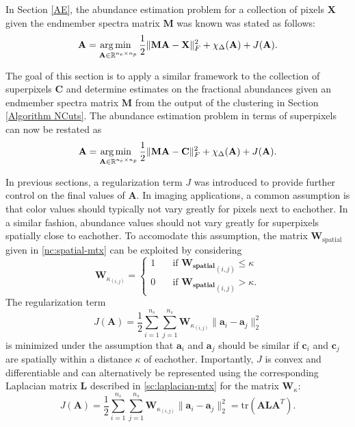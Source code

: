 In Section \ref{AE}, the abundance estimation problem for a collection of pixels $\mathbf{X}$ given the endmember spectra matrix $\mathbf{M}$ was known was stated as follows:
\begin{equation*}
    \mathbf{A} = \operatorname*{arg\,min \;\;}_{\mathbf{A} \in \mathbb{R}^{n_e \times n_p}} \frac{1}{2}\|\mathbf{MA} - \mathbf{X}\|_F^2 + \chi_\Delta(\mathbf{A}) + J(\mathbf{A}).
\end{equation*}

The goal of this section is to apply a similar framework to the collection of superpixels $\mathbf{C}$ and determine estimates on the fractional abundances given an endmember spectra matrix $\mathbf{M}$ from the output of the clustering in Section \ref{Algorithm NCuts}. The abundance estimation problem in terms of superpixels can now be restated as
\begin{equation*}
    \mathbf{A} = \operatorname*{arg\,min \;\;}_{\mathbf{A} \in \mathbb{R}^{n_e \times n_p}} \frac{1}{2}\|\mathbf{MA} - \mathbf{C}\|_F^2 + \chi_\Delta(\mathbf{A}) + J(\mathbf{A}).
\end{equation*}

In previous sections, a regularization term $J$ was introduced to provide further control on the final values of $\mathbf{A}$. In imaging applications, a common assumption is that color values should typically not vary greatly for pixels next to eachother. In a similar fashion, abundance values should not vary greatly for superpixels spatially close to eachother. To accomodate this assumption, the matrix $\mathbf{W}_{\text{spatial}}$ given in \eqref{nc:spatial-mtx} can be exploited by considering
\begin{equation}
    \label{nc:spatial_filter_mtx}
    \mathbf{W}_{{\kappa}_{(i,j)}} = \begin{cases}
        1 &\quad \text{if } \mathbf{W_{\text{spatial}}}_{(i,j)} \leq \kappa\\
        0 &\quad \text{if } \mathbf{W_{\text{spatial}}}_{(i,j)} > \kappa.
    \end{cases}
\end{equation}
The regularization term
\begin{equation*}
    J(\mathbf{A}) = \frac{1}{2}\sum_{i = 1}^{n_s} \sum_{j = 1}^{n_s} \mathbf{W}_{{\kappa}_{(i,j)}} \|\mathbf{a}_i - \mathbf{a}_j\|_2^2
\end{equation*}
is minimized under the assumption that $\mathbf{a}_i$ and $\mathbf{a}_j$ should be similar if $\mathbf{c}_i$ and $\mathbf{c}_j$ are spatially within a distance $\kappa$ of eachother. Importantly, $J$ is convex and differentiable and can alternatively be represented using the corresponding Laplacian matrix $\mathbf{L}$ described in \eqref{sc:laplacian-mtx} for the matrix $\mathbf{W}_{\kappa}$:
\begin{equation}
    \label{unmixing:distance-regularization}
    J(\mathbf{A}) = \frac{1}{2}\sum_{i = 1}^{n_s} \sum_{j = 1}^{n_s} \mathbf{W}_{{\kappa}_{(i,j)}} \|\mathbf{a}_i - \mathbf{a}_j\|_2^2 = \text{tr}(\mathbf{ALA}^T).
\end{equation}

